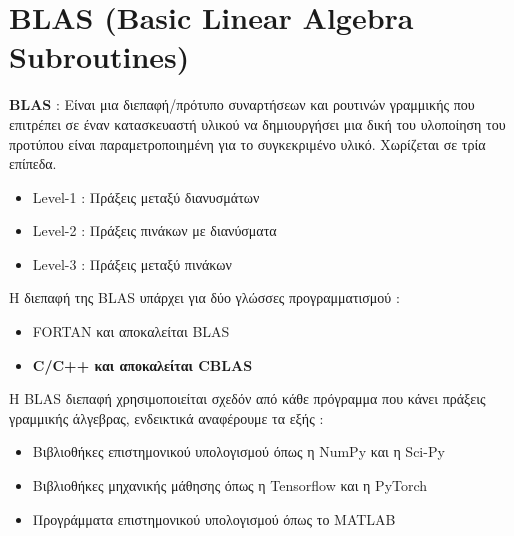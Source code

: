 \documentclass[10pt]{beamer}
\begin{document}
    \section{BLAS (Basic Linear Algebra Subroutines)}
    \begin{frame}
        \begin{block}{}
            \textbf{BLAS} : Είναι μια διεπαφή/πρότυπο συναρτήσεων και ρουτινών γραμμικής που επιτρέπει σε έναν κατασκευαστή υλικού να δημιουργήσει μια δική του υλοποίηση του προτύπου είναι παραμετροποιημένη για το συγκεκριμένο υλικό. Χωρίζεται σε τρία επίπεδα.
            \begin{itemize}
                \item Level-1 : Πράξεις μεταξύ διανυσμάτων
                \item Level-2 : Πράξεις πινάκων με διανύσματα
                \item Level-3 : Πράξεις μεταξύ πινάκων
            \end{itemize}
        \end{block}
        \begin{block}{}
            H διεπαφή της BLAS υπάρχει για δύο γλώσσες προγραμματισμού :
            \begin{itemize}
                \item FORTAN και αποκαλείται BLAS
                \item \textbf{C/C++ και αποκαλείται CBLAS}
            \end{itemize}
            Η BLAS διεπαφή χρησιμοποιείται σχεδόν από κάθε πρόγραμμα που κάνει πράξεις γραμμικής άλγεβρας, ενδεικτικά αναφέρουμε τα εξής :
            \begin{itemize}
                \item Βιβλιοθήκες επιστημονικού υπολογισμού όπως η NumPy και η Sci-Py
                \item Βιβλιοθήκες μηχανικής μάθησης όπως η Tensorflow και η PyTorch
                \item Προγράμματα επιστημονικού υπολογισμού όπως το MATLAB
            \end{itemize}
        \end{block}
    \end{frame}
\end{document}

